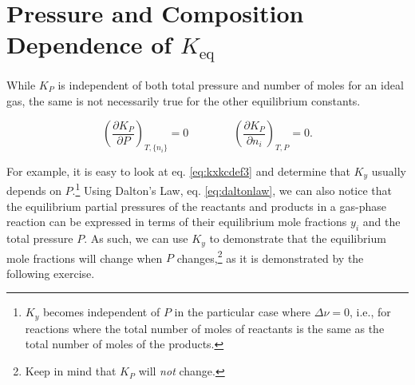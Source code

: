 \documentclass[
  9pt,
]{extbook}
\theoremstyle{definition}
\theoremstyle{definition}
\theoremstyle{definition}
\theoremstyle{definition}
\theoremstyle{remark}
\begin{document}
\section{\texorpdfstring{Pressure and Composition Dependence of \(K_{\text{eq}}\)}{Pressure and Composition Dependence of K\_\{\textbackslash text\{eq\}\}}}\label{pressure-and-composition-dependence-of-k_texteq}

While \(K_P\) is independent of both total pressure and number of moles for an ideal gas, the same is not necessarily true for the other equilibrium constants.

\begin{equation}
\left( \frac{\partial K_P}{\partial P} \right)_{T,\{n_i\}} = 0 \qquad \qquad \left( \frac{\partial K_P}{\partial n_i} \right)_{T,P} =0.
\label{eq:kppni}
\end{equation}

For example, it is easy to look at eq. \eqref{eq:kxkcdef3} and determine that \(K_y\) usually depends on \(P\).\footnote{\(K_y\) becomes independent of \(P\) in the particular case where \(\Delta \nu=0\), i.e., for reactions where the total number of moles of reactants is the same as the total number of moles of the products.} Using Dalton's Law, eq. \eqref{eq:daltonlaw}, we can also notice that the equilibrium partial pressures of the reactants and products in a gas-phase reaction can be expressed in terms of their equilibrium mole fractions \(y_i\) and the total pressure \(P\). As such, we can use \(K_y\) to demonstrate that the equilibrium mole fractions will change when \(P\) changes,\footnote{Keep in mind that \(K_P\) will \emph{not} change.} as it is demonstrated by the following exercise.
\end{document}
